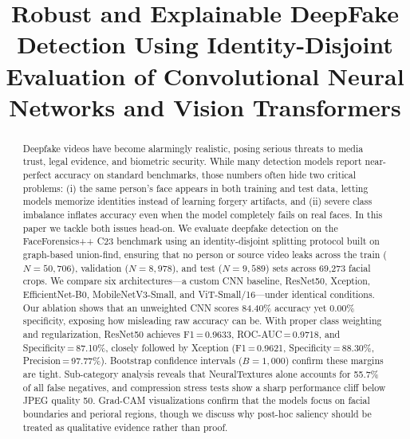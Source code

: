 \documentclass[conference]{IEEEtran}
\begin{document}
\title{Robust and Explainable DeepFake Detection Using Identity-Disjoint Evaluation of Convolutional Neural Networks and Vision Transformers}

\author{
}

\maketitle

\begin{abstract}
Deepfake videos have become alarmingly realistic, posing serious threats to media trust, legal evidence, and biometric security. While many detection models report near-perfect accuracy on standard benchmarks, those numbers often hide two critical problems: (i) the same person's face appears in both training and test data, letting models memorize identities instead of learning forgery artifacts, and (ii) severe class imbalance inflates accuracy even when the model completely fails on real faces. In this paper we tackle both issues head-on. We evaluate deepfake detection on the FaceForensics++ C23 benchmark using an identity-disjoint splitting protocol built on graph-based union-find, ensuring that no person or source video leaks across the train ($N{=}50{,}706$), validation ($N{=}8{,}978$), and test ($N{=}9{,}589$) sets across 69,273 facial crops. We compare six architectures---a custom CNN baseline, ResNet50, Xception, EfficientNet-B0, MobileNetV3-Small, and ViT-Small/16---under identical conditions. Our ablation shows that an unweighted CNN scores 84.40\% accuracy yet 0.00\% specificity, exposing how misleading raw accuracy can be. With proper class weighting and regularization, ResNet50 achieves F1\,=\,0.9633, ROC-AUC\,=\,0.9718, and Specificity\,=\,87.10\%, closely followed by Xception (F1\,=\,0.9621, Specificity\,=\,88.30\%, Precision\,=\,97.77\%). Bootstrap confidence intervals ($B{=}1{,}000$) confirm these margins are tight. Sub-category analysis reveals that NeuralTextures alone accounts for 55.7\% of all false negatives, and compression stress tests show a sharp performance cliff below JPEG quality 50. Grad-CAM visualizations confirm that the models focus on facial boundaries and perioral regions, though we discuss why post-hoc saliency should be treated as qualitative evidence rather than proof.
\end{abstract}
\end{document}
